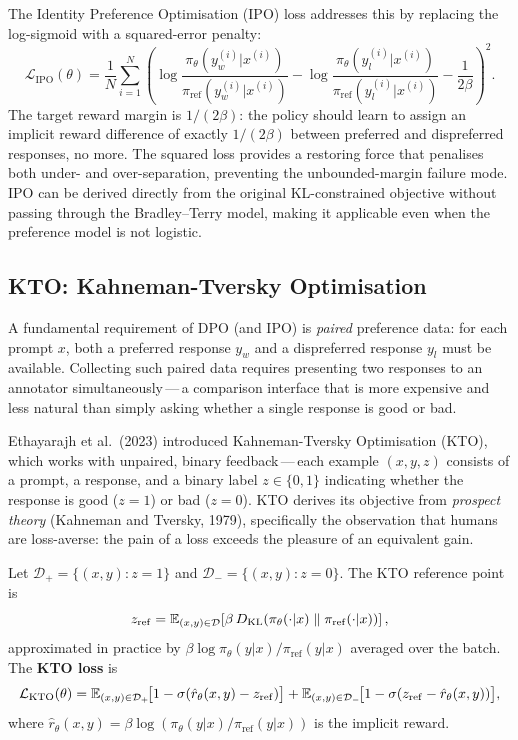 The Identity Preference Optimisation (IPO) loss addresses this by replacing the log-sigmoid with a squared-error penalty:
\begin{equation}
\label{eq:ipo-loss}
\mathcal{L}_\mathrm{IPO}(\theta)
= \frac{1}{N}\sum_{i=1}^{N}
\left(
\log\frac{\pi_\theta(y_w^{(i)}|x^{(i)})}{\pi_\mathrm{ref}(y_w^{(i)}|x^{(i)})}
- \log\frac{\pi_\theta(y_l^{(i)}|x^{(i)})}{\pi_\mathrm{ref}(y_l^{(i)}|x^{(i)})}
- \frac{1}{2\beta}
\right)^2.
\end{equation}
The target reward margin is $1/(2\beta)$: the policy should learn to assign an implicit reward difference of exactly $1/(2\beta)$ between preferred and dispreferred responses, no more. The squared loss provides a restoring force that penalises both under- and over-separation, preventing the unbounded-margin failure mode. IPO can be derived directly from the original KL-constrained objective without passing through the Bradley--Terry model, making it applicable even when the preference model is not logistic.

\subsection{KTO: Kahneman-Tversky Optimisation}

A fundamental requirement of DPO (and IPO) is \emph{paired} preference data: for each prompt $x$, both a preferred response $y_w$ and a dispreferred response $y_l$ must be available. Collecting such paired data requires presenting two responses to an annotator simultaneously\,---\,a comparison interface that is more expensive and less natural than simply asking whether a single response is good or bad.

Ethayarajh et al.\ (2023) introduced Kahneman-Tversky Optimisation (KTO), which works with unpaired, binary feedback\,---\,each example $(x, y, z)$ consists of a prompt, a response, and a binary label $z \in \{0, 1\}$ indicating whether the response is good ($z=1$) or bad ($z=0$). KTO derives its objective from \emph{prospect theory} (Kahneman and Tversky, 1979), specifically the observation that humans are loss-averse: the pain of a loss exceeds the pleasure of an equivalent gain.

\begin{definition}
\label{def:kto-loss}
Let $\mathcal{D}_+ = \{(x, y) : z=1\}$ and $\mathcal{D}_- = \{(x, y) : z=0\}$. The KTO reference point is
\[
z_\mathrm{ref} = \operatorname{\mathbb{E}}_{(x,y) \in \mathcal{D}} \!\left[\beta\,D_{\mathrm{KL}}\!\left(\pi_\theta(\cdot|x)\;\|\;\pi_\mathrm{ref}(\cdot|x)\right)\right],
\]
approximated in practice by $\beta \log\pi_\theta(y|x)/\pi_\mathrm{ref}(y|x)$ averaged over the batch. The \textbf{KTO loss} is
\begin{equation}
\label{eq:kto-loss}
\mathcal{L}_\mathrm{KTO}(\theta)
= \operatorname{\mathbb{E}}_{(x,y)\in\mathcal{D}_+}\!\bigl[1 - \sigma(\hat{r}_\theta(x,y) - z_\mathrm{ref})\bigr]
+ \operatorname{\mathbb{E}}_{(x,y)\in\mathcal{D}_-}\!\bigl[1 - \sigma(z_\mathrm{ref} - \hat{r}_\theta(x,y))\bigr],
\end{equation}
where $\hat{r}_\theta(x,y) = \beta\log(\pi_\theta(y|x)/\pi_\mathrm{ref}(y|x))$ is the implicit reward.
\end{definition}

